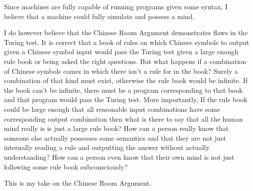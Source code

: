 \documentclass[11pt, a4paper]{article}
\begin{document}
Since machines are fully capable of running programs given some syntax, I believe
that a machine could fully simulate and possess a mind.

I do however believe that the Chinese Room Argument demonstrates flaws in the
Turing test. It is correct that a book of rules on which Chinese symbols to
output given a Chinese symbol input would pass the Turing test given a large
enough rule book or being asked the right questions. But what happens if a 
combination of Chinese symbols comes in which there isn't a rule for in the 
book? Surely a combination of that kind must exist, otherwise the rule book
would be infinite. If the book can't be infinite, there must be a program 
corresponding to that book and that program would pass the Turing test.
More importantly, If the rule book could be large enough that all reasonable
input combinations have some corresponding output combination then what is
there to say that all the human mind really is is just a large rule book?
How can a person really know that someone else actually possesses some semantics
and that they are not just internally reading a rule and outputting the answer
without actually understanding? How can a person even know that their own mind
is not just following some rule book subconsciously?

This is my take on the Chinese Room Argument.




\end{document}
